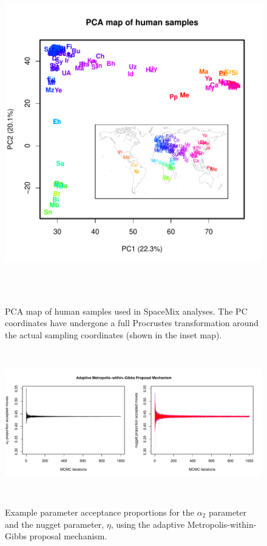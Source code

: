 \documentclass[10pt,letterpaper]{article}
\begin{document}
\clearpage

\begin{figure}
	\centering
		{\includegraphics[width=5.5in,height=5.5in]{../figs/globetrotter/globe_PCA_map.pdf}}
	\caption{PCA map of human samples used in SpaceMix analyses.  The PC coordinates have undergone a full Procrustes transformation around the actual sampling coordinates (shown in the inset map).}
\label{sfig:globe_PCA_map}
\end{figure}

\clearpage

\begin{figure}
	\centering
		{\includegraphics[width=6in,height=2.5in]{../figs/sims/example_acceptance_rates.pdf}}
	\caption{Example parameter acceptance proportions for the $\alpha_2$ parameter and the nugget parameter, $\eta$, using the adaptive Metropolis-within-Gibbs proposal mechanism.}\label{sfig:example_acceptance_rates}
\end{figure}
\end{document}
